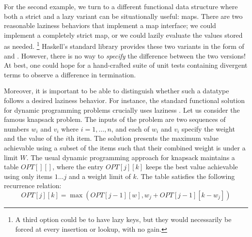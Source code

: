 \documentclass[acmsmall,review]{acmart}\settopmatter{}
\begin{document}
For the second example, we turn to a different functional data structure where
both a strict and a lazy variant can be situationally useful: maps. There are
two reasonable laziness behaviors that implement a map interface; we could
implement a completely strict map, or we could lazily evaluate the values stored
as needed.
\footnote{A third option could be to have lazy keys, but they would
necessarily be forced at every insertion or lookup, with no gain.}
Haskell's standard library provides these two variants in the form of
 and . However, there is no way
to {\em specify} the difference between the two versions! At best, one
could hope for a hand-crafted suite of unit tests containing divergent
terms to observe a difference in termination.


Moreover, it is important to be able to distinguish whether such a
datatype follows a desired laziness behavior.  For instance, the
standard functional solution for dynamic programming problems
crucially uses laziness . Let us consider the famous knapsack problem.
%
The inputs of the problem are two sequences of numbers $w_i$ and $v_i$
where $i = 1, \dots, n$, and each of $w_i$ and $v_i$ specify the
weight and the value of the $i$th item. The solution presents the
maximum value achievable using a subset of the items such that their
combined weight is under a limit $W$.
%
The usual dynamic programming approach for knapsack maintains a
table $OPT[][]$, where the entry $OPT[j][k]$ keeps the best value
achievable using only items $1\dots j$ and a weight limit of $k$. The
table satisfies the following recurrence relation: $$OPT[j][k]
= \max(OPT[j-1][w], w_j + OPT[j-1][k-w_j])$$
\end{document}
